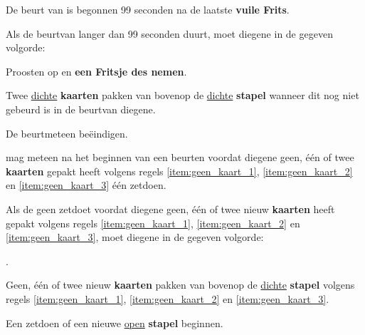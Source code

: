 \vervolgLijst{}
\item De beurt van \Willem is begonnen 99 seconden na de laatste \textbf{vuile Frits}.
\eindLijst{}

\footnotetext[3]{\footnoteEenDubbeleFritsNemen}
\footnotetext[4]{\footnoteFritsjeDesNemen}

\newpage
{}
\label{hoofdstuk:beurten_en_zetten_start}


\vervolgLijst{}
\item Als de beurt\footnotemark[1] van \eenSpeler langer dan 99 seconden duurt, moet diegene in de gegeven volgorde:
\puntLijst{}
\item Proosten op  en \textbf{een Fritsje des nemen}\footnotemark[2].
\item Twee \ul{dichte} \textbf{kaarten} pakken van bovenop de \ul{dichte} \textbf{stapel} wanneer dit nog niet gebeurd is in de beurt\footnotemark[1] van diegene.
\item De beurt\footnotemark[1] meteen beëindigen.
\eindPuntLijst{}
\label{regel:beurt_langer_dan_99}
\eindLijst{}


\vervolgLijst{}
\item \EenSpeler mag meteen na het beginnen van een beurt\footnotemark[1] en voordat diegene geen, \'e\'en of twee \textbf{kaarten} gepakt heeft volgens regels \ref{item:geen_kaart_1}, \ref{item:geen_kaart_2} en \ref{item:geen_kaart_3} \'e\'en zet\footnotemark[3] doen.
\label{regel:zet_zonder_pakker}
\eindLijst{}

\vervolgLijst{}
\item \label{regel:twee_kaarten} Als de \huidigeSpeler geen zet\footnotemark[3] doet voordat diegene geen, \'e\'en of twee nieuw \textbf{kaarten} heeft gepakt volgens regels \ref{item:geen_kaart_1}, \ref{item:geen_kaart_2} en \ref{item:geen_kaart_3}, moet diegene in de gegeven volgorde:
\puntLijst{}
\item \FritsenN\footnotemark[4].
\item Geen, \'e\'en of twee nieuw \textbf{kaarten} pakken van bovenop de \ul{dichte} \textbf{stapel} volgens regels \ref{item:geen_kaart_1}, \ref{item:geen_kaart_2} en \ref{item:geen_kaart_3}.
\item Een zet\footnotemark[3] doen of een nieuwe \ul{open} \textbf{stapel} beginnen.
\eindPuntLijst{}
\label{regel:fritsen_en_kaarten_pakken}
\eindLijst{}

